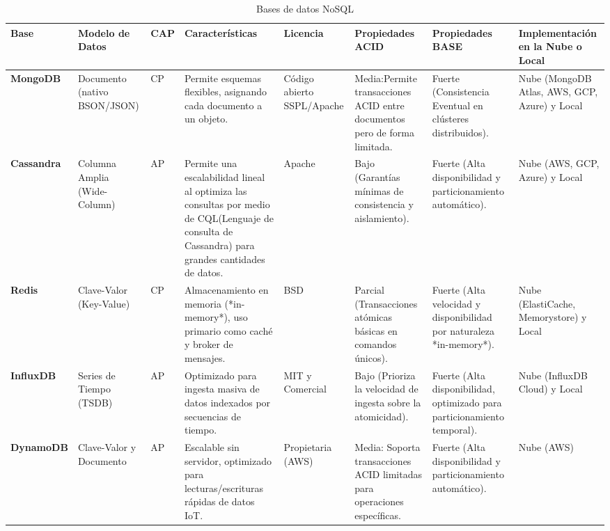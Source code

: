 \begin{landscape}
\begingroup
\setlength{\tabcolsep}{.1pt} %
\renewcommand{\arraystretch}{1.5} %

\begin{table}[h!]

\caption{Bases de datos NoSQL}
\label{tab:nosql}
\footnotesize 
\begin{tabular}{|>{\raggedright\arraybackslash}p{2.5cm}|>{\raggedright\arraybackslash}p{2.5cm}|>{\raggedright\arraybackslash}m{2.5cm}|>{\raggedright\arraybackslash}p{4cm}|>{\raggedright\arraybackslash}p{2.5cm}|>{\raggedright\arraybackslash}p{2.5cm}|>{\raggedright\arraybackslash}p{2.5cm}|>{\raggedright\arraybackslash}p{3cm}|}
\hline
\textbf{Base} & \textbf{Modelo de Datos} & \textbf{CAP}& \textbf{Características} & \textbf{Licencia} & \textbf{Propiedades ACID} & \textbf{Propiedades BASE} & \textbf{Implementación en la Nube o Local} \\
\hline
\textbf{MongoDB}\cite{zotero-item-107} & Documento (nativo BSON/JSON) & CP & Permite esquemas flexibles, asignando cada documento a un objeto. & Código abierto SSPL/Apache & Media:Permite transacciones ACID entre documentos pero de forma limitada. & Fuerte (Consistencia Eventual en clústeres distribuidos). & Nube (MongoDB Atlas, AWS, GCP, Azure) y Local\\
\hline
\textbf{Cassandra}\cite{zotero-item-108} & Columna Amplia (Wide-Column) & AP & Permite una escalabilidad lineal al optimiza las consultas por medio de CQL(Lenguaje de consulta de Cassandra) para grandes cantidades de datos. & Apache & Bajo (Garantías mínimas de consistencia y aislamiento). & Fuerte (Alta disponibilidad y particionamiento automático).& Nube (AWS, GCP, Azure) y Local \\
\hline
\textbf{Redis}\cite{zotero-item-111} & Clave-Valor (Key-Value) & CP & Almacenamiento en memoria (*in-memory*), uso primario como caché y broker de mensajes. & BSD & Parcial (Transacciones atómicas básicas en comandos únicos). & Fuerte (Alta velocidad y disponibilidad por naturaleza *in-memory*). & Nube (ElastiCache, Memorystore) y Local\\
\hline
\textbf{InfluxDB}\cite{zotero-item-113} & Series de Tiempo (TSDB) & AP & Optimizado para ingesta masiva de datos indexados por secuencias de tiempo. & MIT y Comercial & Bajo (Prioriza la velocidad de ingesta sobre la atomicidad). & Fuerte (Alta disponibilidad, optimizado para particionamiento temporal). & Nube (InfluxDB Cloud) y Local\\
\hline
\textbf{DynamoDB} \cite{zotero-item-252} & Clave-Valor y Documento & AP & Escalable sin servidor, optimizado para lecturas/escrituras rápidas de datos IoT. & Propietaria (AWS) & Media: Soporta transacciones ACID limitadas para operaciones específicas. & Fuerte (Alta disponibilidad y particionamiento automático). & Nube (AWS) \\
\hline
    \end{tabular}
\end{table}
\endgroup
\end{landscape}

